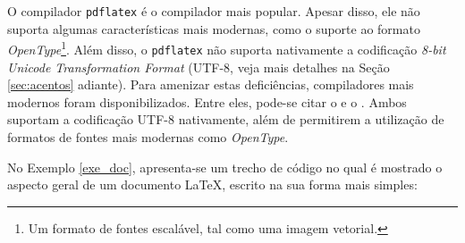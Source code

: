 O compilador {\tt pdflatex} é o compilador mais popular. Apesar disso, ele não suporta algumas características mais modernas, como o suporte ao formato \textit{OpenType}\footnote{Um formato de fontes escalável, tal como uma imagem vetorial.}. Além disso, o {\tt pdflatex} não suporta nativamente a codificação \textit{8-bit Unicode Transformation Format} (UTF-8, veja mais detalhes na Seção \ref{sec:acentos} adiante). Para amenizar estas deficiências, compiladores mais modernos foram disponibilizados. Entre eles, pode-se citar o \XeLaTeX{} e o \LuaTeX{}. Ambos suportam a codificação UTF-8 nativamente, além de permitirem a utilização de formatos de fontes mais modernas como \textit{OpenType}.

No Exemplo \ref{exe_doc}, apresenta-se um trecho de código no qual é mostrado o aspecto geral de um documento \LaTeX{}, escrito na sua forma mais simples:


